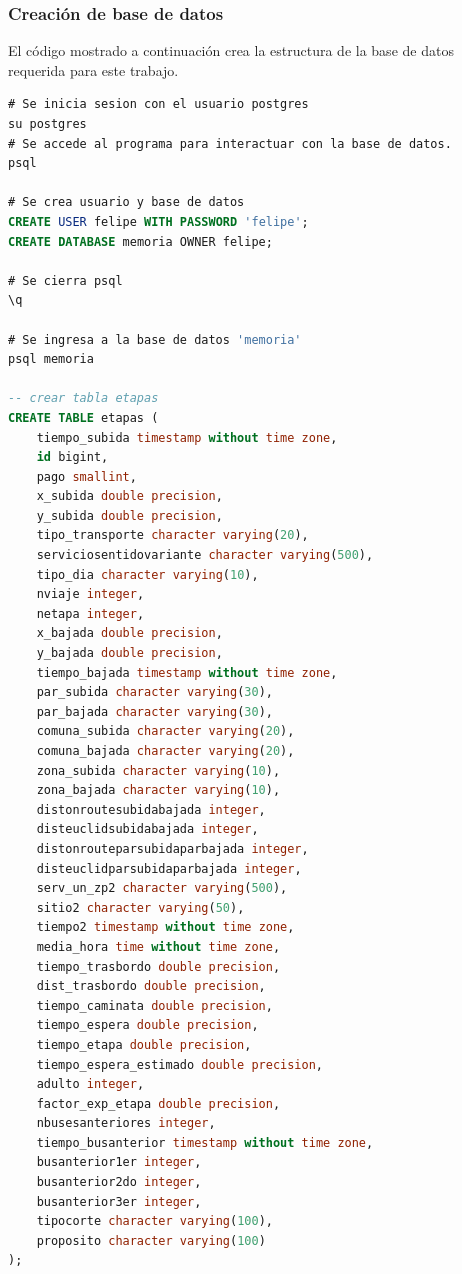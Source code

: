 \documentclass[12pt]{article}
\begin{document}
		\subsubsection{Creación de base de datos}\label{anexo:bd}
		
	El código mostrado a continuación crea la estructura de la base de datos requerida para este trabajo.
	
\begin{lstlisting}[breaklines=true, 
				   language=SQL,  
				   title=asd, 
				   caption=Instalacion de postgres,
				   label=fig:instalar_postgres]
# Se inicia sesion con el usuario postgres 
su postgres
# Se accede al programa para interactuar con la base de datos.
psql

# Se crea usuario y base de datos
CREATE USER felipe WITH PASSWORD 'felipe';
CREATE DATABASE memoria OWNER felipe;

# Se cierra psql
\q

# Se ingresa a la base de datos 'memoria'
psql memoria

-- crear tabla etapas
CREATE TABLE etapas (
    tiempo_subida timestamp without time zone,
    id bigint,
    pago smallint,
    x_subida double precision,
    y_subida double precision,
    tipo_transporte character varying(20),
    serviciosentidovariante character varying(500),
    tipo_dia character varying(10),
    nviaje integer,
    netapa integer,
    x_bajada double precision,
    y_bajada double precision,
    tiempo_bajada timestamp without time zone,
    par_subida character varying(30),
    par_bajada character varying(30),
    comuna_subida character varying(20),
    comuna_bajada character varying(20),
    zona_subida character varying(10),
    zona_bajada character varying(10),
    distonroutesubidabajada integer,
    disteuclidsubidabajada integer,
    distonrouteparsubidaparbajada integer,
    disteuclidparsubidaparbajada integer,
    serv_un_zp2 character varying(500),
    sitio2 character varying(50),
    tiempo2 timestamp without time zone,
    media_hora time without time zone,
    tiempo_trasbordo double precision,
    dist_trasbordo double precision,
    tiempo_caminata double precision,
    tiempo_espera double precision,
    tiempo_etapa double precision,
    tiempo_espera_estimado double precision,
    adulto integer,
    factor_exp_etapa double precision,
    nbusesanteriores integer,
    tiempo_busanterior timestamp without time zone,
    busanterior1er integer,
    busanterior2do integer,
    busanterior3er integer,
    tipocorte character varying(100),
    proposito character varying(100)
);


\end{lstlisting}
\end{document}
